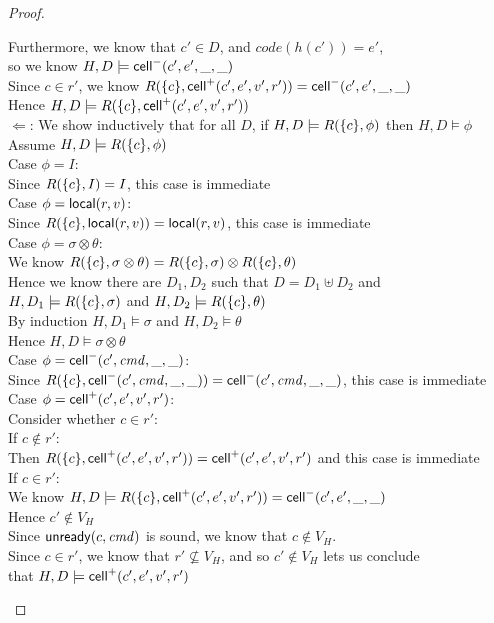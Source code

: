 \begin{proof}
\begin{itemize}
\begin{tabbedproof}
\ooooo Furthermore, we know that $c' \in D$, and $\mathit{code}(h(c')) = e'$, \\
\oooox so we know $H, D \models \mathsf{cell}^{-}({c'}, {e'}, {\_}, {\_})$ \\
\ooooo Since $c \in r'$, we know $R(\{{c}\}, \mathsf{cell}^{+}({c'}, {e'}, {v'}, {r'})) = \mathsf{cell}^{-}({c'}, {e'}, {\_}, {\_})$ \\
\ooooo Hence $H, D \models R(\{{c}\}, \mathsf{cell}^{+}({c'}, {e'}, {v'}, {r'}))$ \\
\oo $\Leftarrow$: We show inductively that for all $D$, if $H, D \models R(\{{c}\}, \phi)$ then $H, D \models \phi$\\
\ooo Assume $H, D \models R(\{{c}\}, \phi)$ \\ 
\ooo Case $\phi = I$: \\
\oooo Since $R(\{{c}\}, I) = I$, this case is immediate \\
\ooo Case $\phi = \mathsf{local}({r}, {v})$: \\
\oooo Since $R(\{{c}\}, \mathsf{local}({r}, {v})) = \mathsf{local}({r}, {v})$, this case is immediate \\
\ooo Case $\phi = \sigma \otimes \theta$: \\
\oooo We know $R(\{{c}\}, \sigma \otimes \theta) = R(\{{c}\}, \sigma) \otimes R(\{{c}\}, \theta)$ \\
\oooo Hence we know there are $D_1, D_2$ such that $D = D_1 \uplus D_2$ and \\
\ooox $H, D_1 \models R(\{{c}\}, \sigma)$ and $H, D_2 \models R(\{{c}\}, \theta)$ \\
\oooo By induction $H, D_1 \models \sigma$ and $H, D_2 \models \theta$ \\
\oooo Hence $H, D \models \sigma \otimes \theta$ \\
\ooo Case $\phi = \mathsf{cell}^{-}({c'}, {\mathit{cmd}}, {\_}, {\_})$: \\
\oooo Since $R(\{{c}\}, \mathsf{cell}^{-}({c'}, {\mathit{cmd}}, {\_}, {\_})) = \mathsf{cell}^{-}({c'}, {\mathit{cmd}}, {\_}, {\_})$, this case is immediate \\
\ooo Case $\phi = \mathsf{cell}^{+}({c'}, {e'}, {v'}, {r'})$: \\
\oooo Consider whether $c \in r'$: \\
\oooo If $c \not\in r'$: \\
\ooooo Then $R(\{{c}\}, \mathsf{cell}^{+}({c'}, {e'}, {v'}, {r'})) = \mathsf{cell}^{+}({c'}, {e'}, {v'}, {r'})$ and this case is immediate \\
\oooo If $c \in r'$: \\
\ooooo We know $H, D \models R(\{{c}\}, \mathsf{cell}^{+}({c'}, {e'}, {v'}, {r'})) = \mathsf{cell}^{-}({c'}, {e'}, {\_}, {\_})$ \\
\ooooo Hence $c' \not\in V_H$ \\
\ooooo Since $\mathsf{unready}({c}, {\mathit{cmd}})$ is sound, we know that $c \not\in V_H$. \\ 
\ooooo Since $c \in r'$, we know that $r' \not\subseteq V_H$, and so $c' \not\in V_H$ lets us conclude \\
\ooooo that $H, D \models \mathsf{cell}^{+}({c'}, {e'}, {v'}, {r'})$ \\
\end{tabbedproof}




\end{itemize}
\end{proof}
